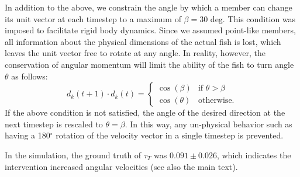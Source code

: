 \documentclass[journal]{IEEEtran}
\begin{document}
In addition to the above, we constrain the angle by which a member can change its unit vector at each timestep to a maximum of $\beta = 30$ deg. This condition was imposed to facilitate rigid body dynamics. Since we assumed point-like members, all information about the physical dimensions of the actual fish is lost, which leaves the unit vector free to rotate at any angle. In reality, however, the conservation of angular momentum will limit the ability of the fish to turn angle $\theta$ as follows:
\begin{equation} 
\label{eq:boid3}
  d_k\left(t+1 \right)\cdot d_k(t) = 
  \begin{cases}
   \cos(\beta ) & \text{if $\theta >\beta$} \\
   \cos\left(\theta \right) & \text{otherwise}.
  \end{cases}
\end{equation} 
If the above condition is not satisfied, the angle of the desired direction at the next timestep is rescaled to $\theta = \beta$. In this way, any un-physical behavior such as having a 180$^\circ$ rotation of the velocity vector in a single timestep is prevented.

In the simulation, the ground truth of $\tau_T$ was $0.091 \pm 0.026$, which indicates the intervention increased angular velocities (see also the main text). 



\end{document}
